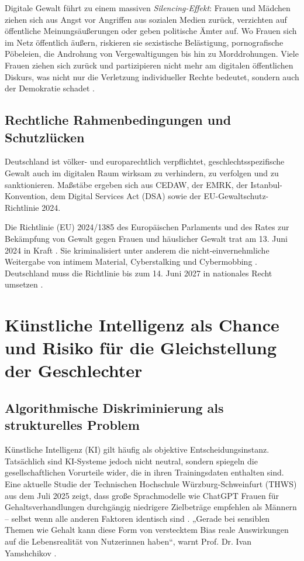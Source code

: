 \documentclass[12pt,a4paper]{article}
\begin{document}
	Digitale Gewalt führt zu einem massiven \textit{Silencing-Effekt}: Frauen und Mädchen ziehen sich aus Angst vor Angriffen aus sozialen Medien zurück, verzichten auf öffentliche Meinungsäußerungen oder geben politische Ämter auf. Wo Frauen sich im Netz öffentlich äußern, riskieren sie sexistische Belästigung, pornografische Pöbeleien, die Androhung von Vergewaltigungen bis hin zu Morddrohungen. Viele Frauen ziehen sich zurück und partizipieren nicht mehr am digitalen öffentlichen Diskurs, was nicht nur die Verletzung individueller Rechte bedeutet, sondern auch der Demokratie schadet \cite{dsa_luecken}.
	
	\subsection{Rechtliche Rahmenbedingungen und Schutzlücken}
	
	Deutschland ist völker- und europarechtlich verpflichtet, geschlechtsspezifische Gewalt auch im digitalen Raum wirksam zu verhindern, zu verfolgen und zu sanktionieren. Maßstäbe ergeben sich aus CEDAW, der EMRK, der Istanbul-Konvention, dem Digital Services Act (DSA) sowie der EU-Gewaltschutz-Richtlinie 2024.
	
	Die Richtlinie (EU) 2024/1385 des Europäischen Parlaments und des Rates zur Bekämpfung von Gewalt gegen Frauen und häuslicher Gewalt trat am 13. Juni 2024 in Kraft \cite{eu_gewalt_richtlinie}. Sie kriminalisiert unter anderem die nicht-einvernehmliche Weitergabe von intimem Material, Cyberstalking und Cybermobbing \cite{eu_gewalt_richtlinie}. Deutschland muss die Richtlinie bis zum 14. Juni 2027 in nationales Recht umsetzen \cite{eu_gewalt_umsetzung}.
	
	\section{Künstliche Intelligenz als Chance und Risiko für die Gleichstellung der Geschlechter}
	
	\subsection{Algorithmische Diskriminierung als strukturelles Problem}
	
	Künstliche Intelligenz (KI) gilt häufig als objektive Entscheidungsinstanz. Tatsächlich sind KI-Systeme jedoch nicht neutral, sondern spiegeln die gesellschaftlichen Vorurteile wider, die in ihren Trainingsdaten enthalten sind. Eine aktuelle Studie der Technischen Hochschule Würzburg-Schweinfurt (THWS) aus dem Juli 2025 zeigt, dass große Sprachmodelle wie ChatGPT Frauen für Gehaltsverhandlungen durchgängig niedrigere Zielbeträge empfehlen als Männern – selbst wenn alle anderen Faktoren identisch sind \cite{thws_gehaltsbias}. „Gerade bei sensiblen Themen wie Gehalt kann diese Form von verstecktem Bias reale Auswirkungen auf die Lebensrealität von Nutzerinnen haben“, warnt Prof. Dr. Ivan Yamshchikov \cite{thws_gehaltsbias_pm}.
	
\end{document}

